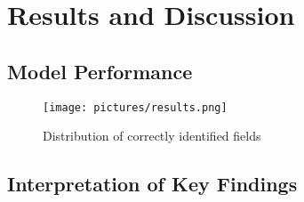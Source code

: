 \chapter{Results and Discussion}

\section{Model Performance}
\begin{figure}[ht]
    \centering 
    \texttt{[image: pictures/results.png]}
    \caption{Distribution of correctly identified fields}
    \label{pic:results_1}    %
\end{figure}
\section{Interpretation of Key Findings}